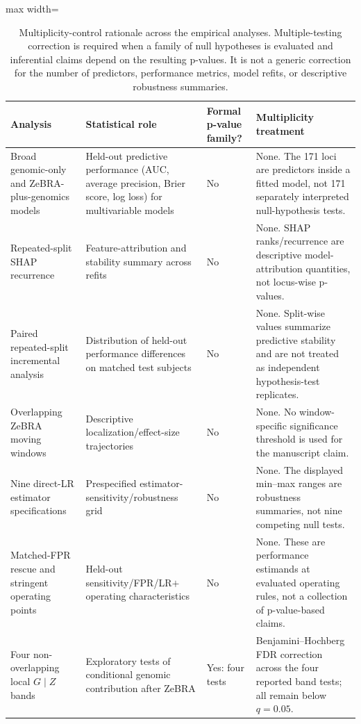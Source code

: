 \begin{table}[!t]
\caption{Multiplicity-control rationale across the empirical analyses. Multiple-testing correction is required when a family of null hypotheses is evaluated and inferential claims depend on the resulting p-values. It is not a generic correction for the number of predictors, performance metrics, model refits, or descriptive robustness summaries.}
\label{tab:supp-multiplicity-rationale}
\centering\scriptsize
\setlength{\tabcolsep}{3.5pt}
\renewcommand{\arraystretch}{1.06}
\begin{adjustbox}{max width=\textwidth}
\begin{tabular}{p{}p{}p{}p{}}
\toprule
Analysis & Statistical role & Formal p-value family? & Multiplicity treatment \\
\midrule
Broad genomic-only and ZeBRA-plus-genomics models & Held-out predictive performance (AUC, average precision, Brier score, log loss) for multivariable models & No & None. The 171 loci are predictors inside a fitted model, not 171 separately interpreted null-hypothesis tests. \\
Repeated-split SHAP recurrence & Feature-attribution and stability summary across refits & No & None. SHAP ranks/recurrence are descriptive model-attribution quantities, not locus-wise p-values. \\
Paired repeated-split incremental analysis & Distribution of held-out performance differences on matched test subjects & No & None. Split-wise values summarize predictive stability and are not treated as independent hypothesis-test replicates. \\
Overlapping ZeBRA moving windows & Descriptive localization/effect-size trajectories & No & None. No window-specific significance threshold is used for the manuscript claim. \\
Nine direct-LR estimator specifications & Prespecified estimator-sensitivity/robustness grid & No & None. The displayed min--max ranges are robustness summaries, not nine competing null tests. \\
Matched-FPR rescue and stringent operating points & Held-out sensitivity/FPR/LR$+$ operating characteristics & No & None. These are performance estimands at evaluated operating rules, not a collection of p-value-based claims. \\
Four non-overlapping local $G\mid Z$ bands & Exploratory tests of conditional genomic contribution after ZeBRA & Yes: four tests & Benjamini--Hochberg FDR correction across the four reported band tests; all remain below $q=0.05$. \\
\bottomrule
\end{tabular}
\end{adjustbox}
\end{table}

